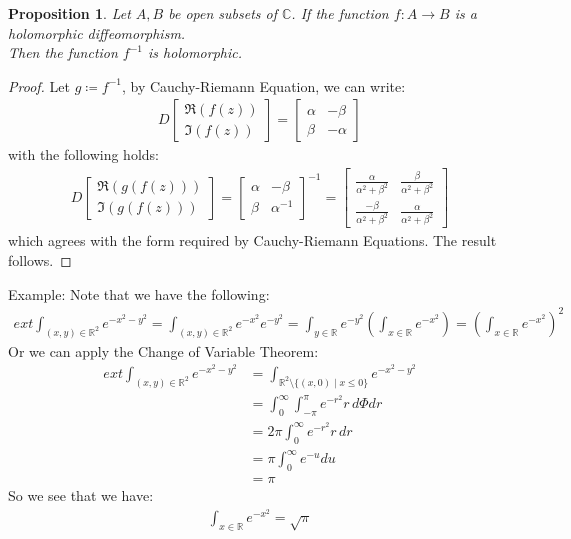 \documentclass[11pt,oneside]{book}
\theoremstyle{break}
\theoremstyle{break}
\newtheorem{prop}[lem]{Proposition}
\newcommand{\R}{\mathbb{R}}
\newcommand{\Complex}{\mathbb{C}}
\newcommand{\bmat}[1]{\begin{bmatrix} #1 \end{bmatrix}}
\newcommand{\example}{\color{green}Example: \color{black}}
\begin{document}
\begin{prop}
Let $A,B$ be open subsets of $\Complex$. If the function $f:A \to B$ is a holomorphic diffeomorphism. \\Then the function $f^{-1}$ is holomorphic.
\end{prop}
\begin{proof}
Let $g\coloneqq f^{-1}$, by Cauchy-Riemann Equation, we can write:
\begin{align*}
D\bmat{\Re(f(z))\\ \Im(f(z))} = \bmat{\alpha & -\beta \\ \beta &-\alpha}
\end{align*}
with the following holds:
\begin{align*}
D\bmat{\Re(g(f(z)))\\ \Im(g(f(z)))} = \bmat{\alpha & -\beta \\ \beta &\alpha^{-1}}^{-1} = \bmat{\frac{\alpha}{\alpha^2+\beta^2}& \frac{\beta}{\alpha^2+\beta^2} \\ \frac{-\beta}{\alpha^2+\beta^2} & \frac{\alpha}{\alpha^2+\beta^2}}
\end{align*}
which agrees with the form required by Cauchy-Riemann Equations. The result follows.
\end{proof}


\example Note that we have the following:
\begin{align*}
ext \int_{(x,y) \in \R^2}e^{-x^2 - y^2} = \int_{(x,y) \in \R^2}e^{-x^2}e^{-y^2} = \int_{y \in \R} e^{-y^2} \left(\int_{x \in \R} e^{-x^2} \right) = \left(\int_{x \in \R} e^{-x^2}\right)^2
\end{align*}
Or we can apply the Change of Variable Theorem:
\begin{align*}
ext \int_{(x,y) \in \R^2}e^{-x^2 - y^2} &= \int_{\R^2\setminus \{(x,0) \mid x\leq 0\}} e^{-x^2-y^2}\\
&= \int_{0}^\infty \int_{-\pi}^{\pi} e^{-r^2} r\, d\Phi dr \\
&= 2\pi \int_{0}^{\infty} e^{-r^2} r\, dr \\
&= \pi \int_{0}^\infty e^{-u} du \\
&= \pi
\end{align*}
So we see that we have:
\begin{align*}
\int_{x \in \R} e^{-x^2} = \sqrt{\pi}
\end{align*}
\end{document}
